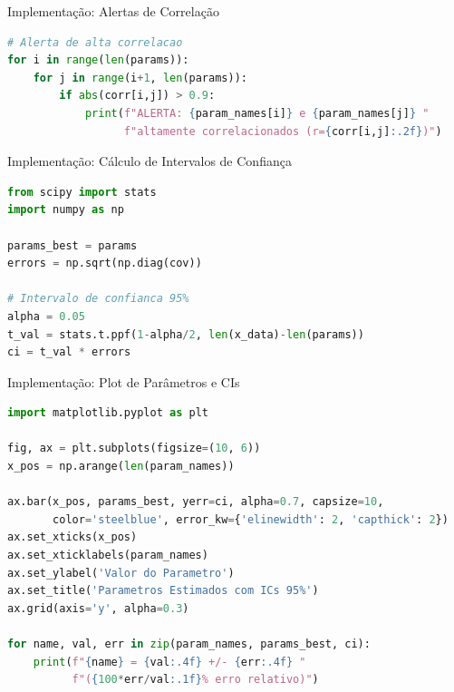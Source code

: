 \begin{frame}[fragile]{Implementação: Alertas de Correlação}
\begin{lstlisting}[language=Python, caption=Deteccao de parametros colineares, basicstyle=\ttfamily\footnotesize]
# Alerta de alta correlacao
for i in range(len(params)):
    for j in range(i+1, len(params)):
        if abs(corr[i,j]) > 0.9:
            print(f"ALERTA: {param_names[i]} e {param_names[j]} "
                  f"altamente correlacionados (r={corr[i,j]:.2f})")
\end{lstlisting}
\end{frame}

\begin{frame}[fragile]{Implementação: Cálculo de Intervalos de Confiança}
\begin{lstlisting}[language=Python, caption=Calcular ICs usando distribuicao t, basicstyle=\ttfamily\footnotesize]
from scipy import stats
import numpy as np

params_best = params
errors = np.sqrt(np.diag(cov))

# Intervalo de confianca 95%
alpha = 0.05
t_val = stats.t.ppf(1-alpha/2, len(x_data)-len(params))
ci = t_val * errors
\end{lstlisting}
\end{frame}

\begin{frame}[fragile]{Implementação: Plot de Parâmetros e CIs}
\begin{lstlisting}[language=Python, caption=Visualizar parametros com barras de erro, basicstyle=\ttfamily\scriptsize]
import matplotlib.pyplot as plt

fig, ax = plt.subplots(figsize=(10, 6))
x_pos = np.arange(len(param_names))

ax.bar(x_pos, params_best, yerr=ci, alpha=0.7, capsize=10,
       color='steelblue', error_kw={'elinewidth': 2, 'capthick': 2})
ax.set_xticks(x_pos)
ax.set_xticklabels(param_names)
ax.set_ylabel('Valor do Parametro')
ax.set_title('Parametros Estimados com ICs 95%')
ax.grid(axis='y', alpha=0.3)

for name, val, err in zip(param_names, params_best, ci):
    print(f"{name} = {val:.4f} +/- {err:.4f} "
          f"({100*err/val:.1f}% erro relativo)")
\end{lstlisting}
\end{frame}

